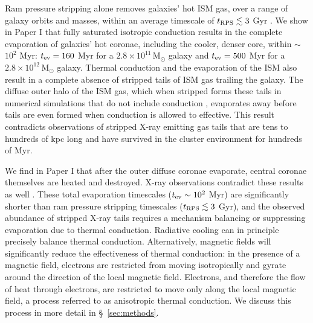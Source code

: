 \documentclass[twocolumn]{aastex6}
\newcommand{\msun}{\, \mbox{M}_{\odot}}
\begin{document}
Ram pressure stripping alone removes galaxies' hot ISM gas, over a range of galaxy orbits and masses, within an average timescale of $t_{\rm RPS} \lesssim 3$ Gyr \citep{Vijayaraghavan15b}.  We show in Paper I that fully saturated isotropic conduction results in the complete evaporation of galaxies' hot coronae, including the cooler, denser core, within $\sim$ $10^2$ Myr:
$t_{\rm ev} = 160$ Myr for a $2.8 \times 10^{11} \msun$ galaxy and $t_{\rm ev} = 500$ Myr for a $2.8 \times 10^{12} \msun$ galaxy. Thermal conduction and the evaporation of the ISM also result in a complete absence of stripped tails of ISM gas trailing the galaxy. The diffuse outer halo of the ISM gas, which when stripped forms these tails in numerical simulations that do not include conduction \citep[e.g.,][]{Toniazzo01,Acreman03,Shin14,Vijayaraghavan15b,Roediger15a,Roediger15b}, evaporates away before tails are even formed when conduction is allowed to effective. This result contradicts observations of stripped X-ray emitting gas tails
\citep[e.g.,][]{Forman79,Irwin96,Sun05b,Machacek06,Randall08,Kim08,Sun10,Kraft11,Zhang13} that are tens to hundreds of kpc long and have survived in the cluster environment for hundreds of Myr. 

We find in Paper I that after the outer diffuse coronae evaporate, central coronae themselves are heated and destroyed. X-ray observations contradict these results as well \citep[e.g.,][]{Vikhlinin01,Yamasaki02,Sun05c,Sun05,Sun07,Jeltema08}. These total evaporation timescales ($t_{\rm ev} \sim 10^2$ Myr) are significantly shorter than ram pressure stripping timescales ($t_{\rm RPS} \lesssim 3$ Gyr), and the observed abundance of stripped X-ray tails requires a mechanism balancing or suppressing evaporation due to thermal conduction. Radiative cooling can in principle precisely balance thermal conduction. Alternatively, magnetic fields will significantly reduce the effectiveness of thermal conduction: in the presence of a magnetic field, electrons are restricted from moving isotropically and gyrate around the direction of the local magnetic field. Electrons, and therefore the flow of heat through electrons, are restricted to move only along the local magnetic field, a process referred to as anisotropic thermal conduction. We discuss this process in more detail in \S~\ref{sec:methods}.
\end{document}
